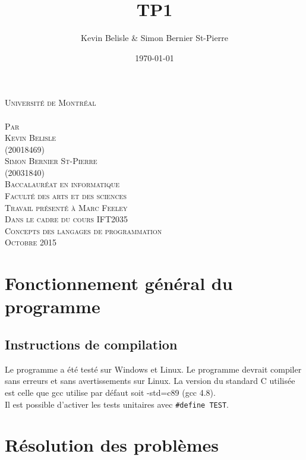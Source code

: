\documentclass[a4paper,12pt,french]{article}
\date{\today}
\author{Kevin Belisle \& Simon Bernier St-Pierre}
\title{TP1}
\newcommand{\Teacher}{Marc Feeley}
\newcommand{\ClassNum}{IFT2035}
\newcommand{\ClassName}{Concepts des langages de programmation}
\newcommand{\DateMMMMYYYY}{Octobre 2015}
\newcommand{\Author}{Kevin Belisle}
\newcommand{\Authorr}{Simon Bernier St-Pierre}
\begin{document}
\begin{titlepage}
	\begin{center}
		\textsc{\normalsize Université de Montréal}\\[2.5cm]

		\textsc{\LARGE \@title}\\[2.5cm]

		\textsc{\small Par}\\[0.25cm]
		\textsc{\LARGE \Author}\\[0.25cm]
		\textsc{\normalsize (20018469)}\\[0.25cm]
		\textsc{\LARGE \Authorr}\\[0.25cm]
		\textsc{\normalsize (20031840)}\\[2.5cm]

		\textsc{\normalsize Baccalauréat en informatique}\\
		\textsc{\normalsize Faculté des arts et des sciences}\\[2.5cm]

		\textsc{\small Travail présenté à \Teacher}\\
		\textsc{\small Dans le cadre du cours \ClassNum}\\
		\textsc{\small \ClassName}\\[2.5cm]

		\textsc{\normalsize \DateMMMMYYYY}\\[1.5cm]
	\end{center}
\end{titlepage}
\section{Fonctionnement général du programme}

	\subsection{Instructions de compilation}
	Le programme a été testé sur Windows et Linux. Le programme devrait compiler
	sans erreurs et sans avertissements sur Linux. La version du standard C
	utilisée est celle que gcc utilise par défaut soit -std=c89 (gcc 4.8).\\

	Il est possible d'activer les tests unitaires avec \lstinline$#define TEST$.

\section{Résolution des problèmes}
	\renewcommand{\thesubsection}{(\alph{subsection})}
\end{document}
